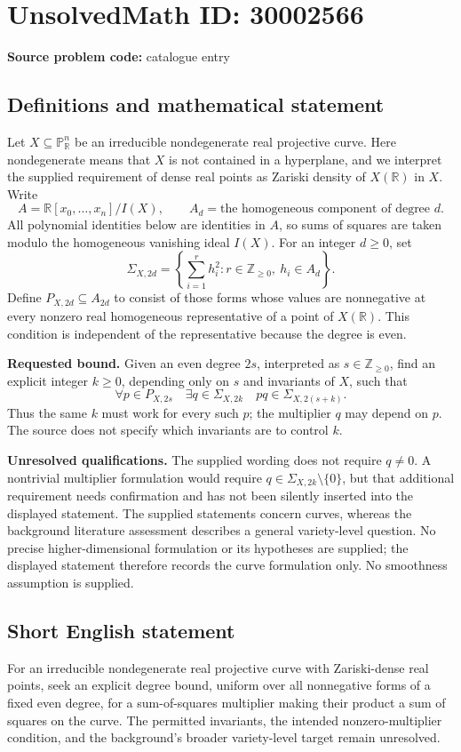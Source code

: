 \documentclass[11pt]{article}
\newcommand{\Z}{\mathbb{Z}}
\newcommand{\R}{\mathbb{R}}
\newcommand{\PP}{\mathbb{P}}
\begin{document}
\section*{UnsolvedMath ID: 30002566}
\textbf{Source problem code:} catalogue entry
\subsection{Definitions and mathematical statement}
Let \(X\subseteq\PP^n_{\R}\) be an irreducible nondegenerate real projective curve. Here nondegenerate means that \(X\) is not contained in a hyperplane, and we interpret the supplied requirement of dense real points as Zariski density of \(X(\R)\) in \(X\). Write
\[
A=\R[x_0,\ldots,x_n]/I(X),\qquad A_d=\text{the homogeneous component of degree }d.
\]
All polynomial identities below are identities in \(A\), so sums of squares are taken modulo the homogeneous vanishing ideal \(I(X)\). For an integer \(d\geq0\), set
\[
\Sigma_{X,2d}=\left\{\sum_{i=1}^{r}h_i^2:r\in\Z_{\geq0},\ h_i\in A_d\right\}.
\]
Define \(P_{X,2d}\subseteq A_{2d}\) to consist of those forms whose values are nonnegative at every nonzero real homogeneous representative of a point of \(X(\R)\). This condition is independent of the representative because the degree is even.

\textbf{Requested bound.} Given an even degree \(2s\), interpreted as \(s\in\Z_{\geq0}\), find an explicit integer \(k\geq0\), depending only on \(s\) and invariants of \(X\), such that
\[
\forall p\in P_{X,2s}\quad
\exists q\in\Sigma_{X,2k}\quad
pq\in\Sigma_{X,2(s+k)}.
\]
Thus the same \(k\) must work for every such \(p\); the multiplier \(q\) may depend on \(p\). The source does not specify which invariants are to control \(k\).

\textbf{Unresolved qualifications.} The supplied wording does not require \(q\neq0\). A nontrivial multiplier formulation would require \(q\in\Sigma_{X,2k}\setminus\{0\}\), but that additional requirement needs confirmation and has not been silently inserted into the displayed statement. The supplied statements concern curves, whereas the background literature assessment describes a general variety-level question. No precise higher-dimensional formulation or its hypotheses are supplied; the displayed statement therefore records the curve formulation only. No smoothness assumption is supplied.
\subsection{Short English statement}
For an irreducible nondegenerate real projective curve with Zariski-dense real points, seek an explicit degree bound, uniform over all nonnegative forms of a fixed even degree, for a sum-of-squares multiplier making their product a sum of squares on the curve. The permitted invariants, the intended nonzero-multiplier condition, and the background's broader variety-level target remain unresolved.
\end{document}
